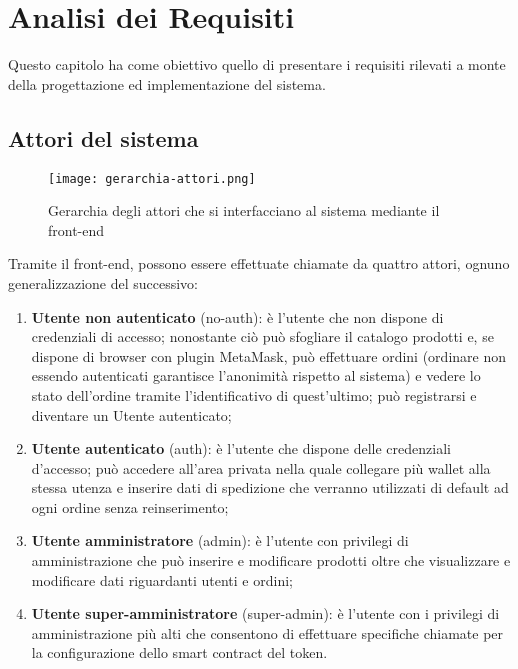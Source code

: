 
\chapter{Analisi dei Requisiti}
\label{cap:analisi-requisiti}
Questo capitolo ha come obiettivo quello di presentare i requisiti rilevati a monte della progettazione ed implementazione del sistema.

\section{Attori del sistema}
\begin{figure}[h!]
    \centering
    \hspace*{-2cm}
    \texttt{[image: gerarchia-attori.png]}
    \caption{Gerarchia degli attori che si interfacciano al sistema mediante il front-end}
\end{figure}
Tramite il front-end, possono essere effettuate chiamate da quattro attori, ognuno generalizzazione del successivo:
\begin{enumerate}
    \item \textbf{Utente non autenticato} (no-auth): è l'utente che non dispone di credenziali di accesso; nonostante ciò può sfogliare il catalogo prodotti e, se dispone di browser con plugin MetaMask, può effettuare ordini (ordinare non essendo autenticati garantisce l'anonimità rispetto al sistema) e vedere lo stato dell'ordine tramite l'identificativo di quest'ultimo; può registrarsi e diventare un Utente autenticato;
    \item \textbf{Utente autenticato} (auth): è l'utente che dispone delle credenziali d'accesso; può accedere all'area privata nella quale collegare più wallet alla stessa utenza e inserire dati di spedizione che verranno utilizzati di default ad ogni ordine senza reinserimento;
    \item \textbf{Utente amministratore} (admin): è l'utente con privilegi di amministrazione che può inserire e modificare prodotti oltre che visualizzare e modificare dati riguardanti utenti e ordini;
    \item \textbf{Utente super-amministratore} (super-admin): è l'utente con i privilegi di amministrazione più alti che consentono di effettuare specifiche chiamate per la configurazione dello smart contract del token.
\end{enumerate}

